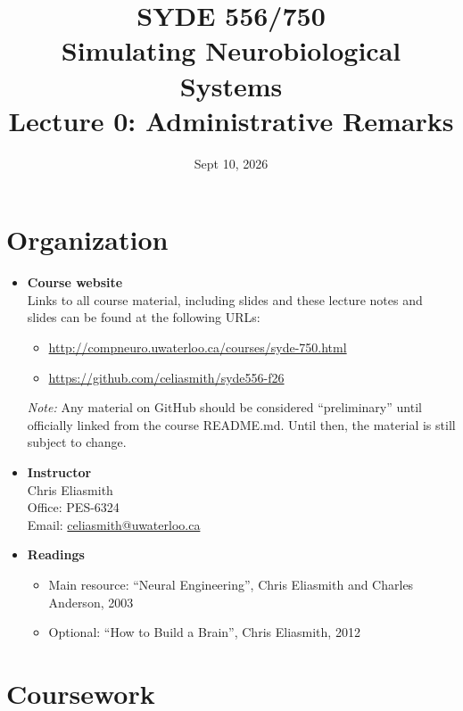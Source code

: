 \documentclass[10pt,letterpaper,oneside]{article}
\date{Sept 10, 2026}
\title{SYDE 556/750 \\ Simulating Neurobiological Systems \\ Lecture 0: Administrative Remarks}
\begin{document}

\section{Organization}

\begin{itemize}
	\item \textbf{Course website}\\
		  Links to all course material, including slides and these lecture notes and slides can be found at the following URLs:
		  \begin{itemize}
		  	\item \url{http://compneuro.uwaterloo.ca/courses/syde-750.html}
		  	\item \url{https://github.com/celiasmith/syde556-f26}
		  \end{itemize}
		  \emph{Note:} Any material on GitHub should be considered \enquote{preliminary} until officially linked from the course README.md. Until then, the material is still subject to change.
	\item \textbf{Instructor}\\
		  Chris Eliasmith\\
		  Office: PES-6324\\
		  Email: \url{celiasmith@uwaterloo.ca}

	\item \textbf{Readings}
		\begin{itemize}
			\item Main resource: \enquote{Neural Engineering}, Chris Eliasmith and Charles Anderson, 2003 \cite{eliasmith2003neural}
			\item Optional: \enquote{How to Build a Brain}, Chris Eliasmith, 2012 \cite{eliasmith2013how}
		\end{itemize}
\end{itemize}

\newpage

\section{Coursework}
\end{document}
